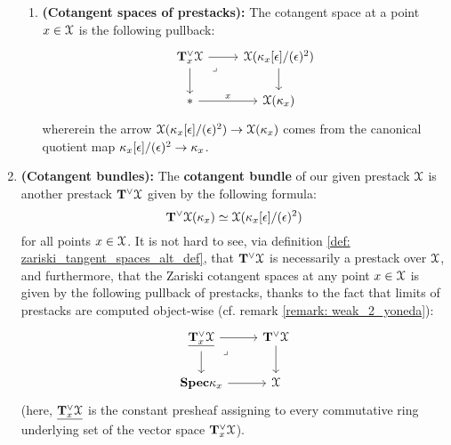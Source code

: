 \begin{definition}
\begin{enumerate}
\begin{enumerate}
                                \item \textbf{(Cotangent spaces of prestacks):} The cotangent space at a point $x \in \mathcal{X}$ is the following pullback:
                                    $$
                                        \begin{tikzcd}
                                        	{\bfT^{\vee}_x\calX} & {\calX(\kappa_x[\e]/(\e)^2)} \\
                                        	{*} & {\calX(\kappa_x)}
                                        	\arrow["x", from=2-1, to=2-2]
                                        	\arrow[from=1-1, to=2-1]
                                        	\arrow[from=1-1, to=1-2]
                                        	\arrow[from=1-2, to=2-2]
                                        	\arrow["\lrcorner"{anchor=center, pos=0.125}, draw=none, from=1-1, to=2-2]
                                        \end{tikzcd}
                                    $$
                                whererein the arrow $\mathcal{X}(\kappa_x[\epsilon]/(\epsilon)^2) \to \mathcal{X}(\kappa_x)$ comes from the canonical quotient map $\kappa_x[\epsilon]/(\epsilon)^2 \to \kappa_x$.
                            \end{enumerate}
                        \item \textbf{(Cotangent bundles):} The \textbf{cotangent bundle} of our given prestack $\mathcal{X}$ is another prestack $\mathbf{T}^{\vee}\mathcal{X}$ given by the following formula:
                            $$\mathbf{T}^{\vee}\mathcal{X}(\kappa_x) \simeq \mathcal{X}(\kappa_x[\epsilon]/(\epsilon)^2)$$
                        for all points $x \in \mathcal{X}$. It is not hard to see, via definition \ref{def: zariski_tangent_spaces_alt_def}, that $\mathbf{T}^{\vee}\mathcal{X}$ is necessarily a prestack over $\mathcal{X}$, and furthermore, that the Zariski cotangent spaces at any point $x \in \mathcal{X}$ is given by the following pullback of prestacks, thanks to the fact that limits of prestacks are computed object-wise (cf. remark \ref{remark: weak_2_yoneda}):
                            $$
                                \begin{tikzcd}
                                	{\underline{\bfT^{\vee}_x\calX}} & {\bfT^{\vee}\calX} \\
                                	{\Spec \kappa_x} & \calX
                                	\arrow[from=1-2, to=2-2]
                                	\arrow[from=2-1, to=2-2]
                                	\arrow[from=1-1, to=1-2]
                                	\arrow[from=1-1, to=2-1]
                                	\arrow["\lrcorner"{anchor=center, pos=0.125}, draw=none, from=1-1, to=2-2]
                                \end{tikzcd}
                            $$
                        (here, $\underline{\mathbf{T}^{\vee}_x\mathcal{X}}$ is the constant presheaf assigning to every commutative ring underlying set of the vector space $\mathbf{T}^{\vee}_x\mathcal{X}$).
                    \end{enumerate}
            \end{definition}

